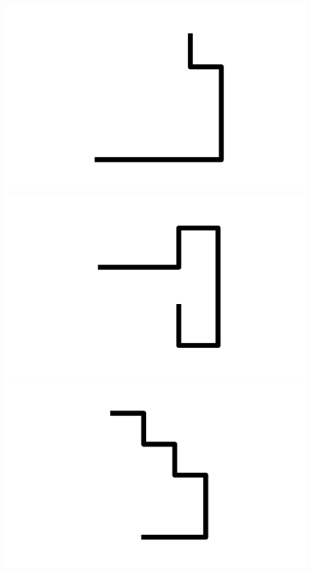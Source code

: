 \documentclass[]{report}
\begin{document}
\includegraphics[scale=.1]{pictures/21/state_cluster_shapes_34.pdf} 
\includegraphics[scale=.1]{pictures/21/state_cluster_shapes_35.pdf} 
\includegraphics[scale=.1]{pictures/21/state_cluster_shapes_36.pdf} 
\end{document}

